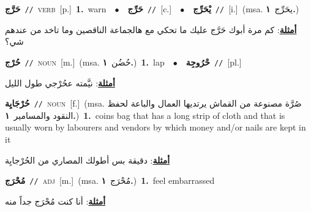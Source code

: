 \documentclass[10pt,a4paper,twoside]{article} %
\begin{document}
\begin{multicols}{2}
{\setlength\topsep{0pt}\textbf{\foreignlanguage{arabic}{حَرَّج}}\ {\color{gray}\texttt{//}\color{black}}\ \textsc{verb}\ [p.]\ \textbf{1.}~warn\ \ $\bullet$\ \ \setlength\topsep{0pt}\textbf{\foreignlanguage{arabic}{حَرِّج}}\ {\color{gray}\texttt{//}\color{black}}\ [c.]\ \ $\bullet$\ \ \setlength\topsep{0pt}\textbf{\foreignlanguage{arabic}{يْحَرِّج}}\ {\color{gray}\texttt{//}\color{black}}\ [i.]\ \color{gray}(msa. \foreignlanguage{arabic}{يحَرِّج}~\foreignlanguage{arabic}{\textbf{١.}})\color{black}\  \begin{flushright}\color{gray}\foreignlanguage{arabic}{\textbf{\underline{\foreignlanguage{arabic}{أمثلة}}}: كم مرة أبوك حَرَّج عليك ما تحكي مع هالجماعة الناقصين وما تاخد من عندهم شي؟}\end{flushright}\color{black}} \vspace{2mm}

{\setlength\topsep{0pt}\textbf{\foreignlanguage{arabic}{حُرْج}}\ {\color{gray}\texttt{//}\color{black}}\ \textsc{noun}\ [m.]\ \color{gray}(msa. \foreignlanguage{arabic}{حُضُن}~\foreignlanguage{arabic}{\textbf{١.}})\color{black}\ \textbf{1.}~lap\ \ $\bullet$\ \ \setlength\topsep{0pt}\textbf{\foreignlanguage{arabic}{حْرُوجِة}}\ {\color{gray}\texttt{//}\color{black}}\ [pl.]\  \begin{flushright}\color{gray}\foreignlanguage{arabic}{\textbf{\underline{\foreignlanguage{arabic}{أمثلة}}}: نيَّمته عحُرْجي طول الليل}\end{flushright}\color{black}} \vspace{2mm}

{\setlength\topsep{0pt}\textbf{\foreignlanguage{arabic}{حُرْجَايِة}}\ {\color{gray}\texttt{//}\color{black}}\ \textsc{noun}\ [f.]\ \color{gray}(msa. \foreignlanguage{arabic}{صُرَّة مصنوعة من القماش يرتديها العمال والباعة لحفظ النقود والمسامير}~\foreignlanguage{arabic}{\textbf{١.}})\color{black}\ \textbf{1.}~coins bag that has a long strip of cloth and that is usually worn by labourers and vendors by which money and/or nails are kept in it\  \begin{flushright}\color{gray}\foreignlanguage{arabic}{\textbf{\underline{\foreignlanguage{arabic}{أمثلة}}}: دقيقة بس أطولك المصاري من الحُرْجايِة}\end{flushright}\color{black}} \vspace{2mm}

{\setlength\topsep{0pt}\textbf{\foreignlanguage{arabic}{مُحْرَج}}\ {\color{gray}\texttt{//}\color{black}}\ \textsc{adj}\ [m.]\ \color{gray}(msa. \foreignlanguage{arabic}{مُحْرَج}~\foreignlanguage{arabic}{\textbf{١.}})\color{black}\ \textbf{1.}~feel embarrassed\  \begin{flushright}\color{gray}\foreignlanguage{arabic}{\textbf{\underline{\foreignlanguage{arabic}{أمثلة}}}: أنا كنت مُحْرَج جداً منه}\end{flushright}\color{black}} \vspace{2mm}


\end{multicols}
\end{document}
